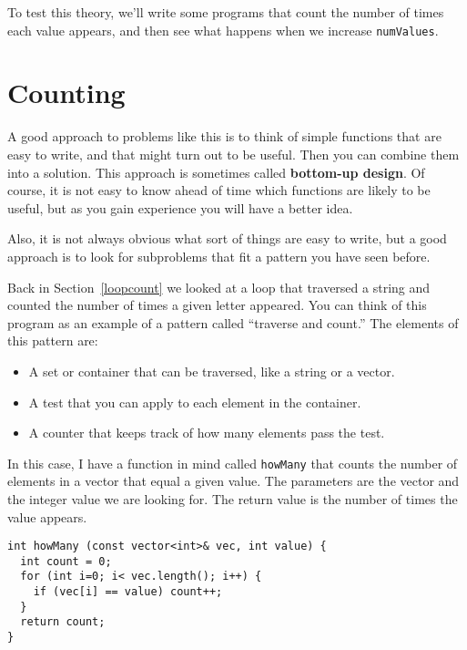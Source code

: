 To test this theory, we'll write some programs that count the
number of times each value appears, and then see what happens
when we increase {\tt numValues}.

\section{Counting}
\label{counting}

A good approach to problems like this is to think of simple functions
that are easy to write, and that might turn out to be useful.  Then
you can combine them into a solution.  This approach is sometimes
called {\bf bottom-up design}.  Of course, it is not easy to
know ahead of time which functions are likely to be useful, but as you
gain experience you will have a better idea.


Also, it is not always obvious what sort of things are easy to write,
but a good approach is to look for subproblems that fit a pattern you
have seen before.


Back in Section~\ref{loopcount} we looked at a loop that traversed a
string and counted the number of times a given letter appeared.  You
can think of this program as an example of a pattern called ``traverse
and count.''  The elements of this pattern are:

\begin{itemize}

\item A set or container that can be traversed, like a string
or a vector.

\item A test that you can apply to each element in the container.

\item A counter that keeps track of how many elements pass
the test.

\end{itemize}

In this case, I have a function in mind called {\tt howMany} that
counts the number of elements in a vector that equal a given value.
The parameters are the vector and the integer value we are looking
for.  The return value is the number of times the value appears.

\begin{verbatim}
int howMany (const vector<int>& vec, int value) {
  int count = 0;
  for (int i=0; i< vec.length(); i++) {
    if (vec[i] == value) count++;
  }
  return count;
}
\end{verbatim}


